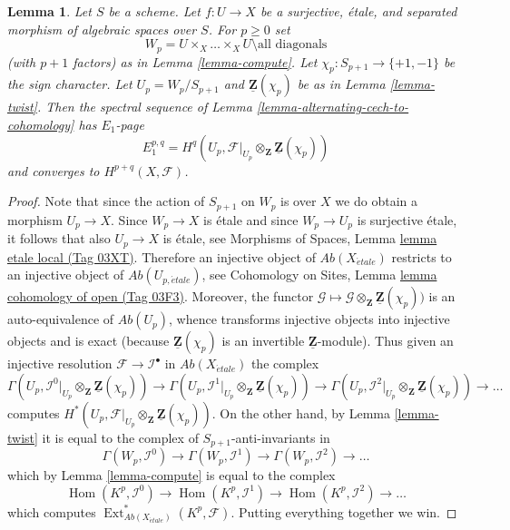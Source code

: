 \documentclass{amsart}
\theoremstyle{plain}
\newtheorem{lemma}[subsection]{Lemma}
\theoremstyle{definition}
\theoremstyle{remark}
\numberwithin{equation}{subsection}
\def\Hom{\mathop{\mathrm{Hom}}\nolimits}
\def\Ext{\mathop{\mathrm{Ext}}\nolimits}
\def\etale{{\acute{e}tale}}
\begin{document}
\begin{lemma}
\label{lemma-alternating-spectral-sequence}
Let $S$ be a scheme. Let $f : U \to X$ be a surjective, \'etale, and
separated morphism of algebraic spaces over $S$. For $p \geq 0$ set
$$
W_p = U \times_X \ldots \times_X U \setminus \text{all diagonals}
$$
(with $p + 1$ factors) as in Lemma \ref{lemma-compute}.
Let $\chi_p : S_{p + 1} \to \{+1, -1\}$ be the sign character.
Let $U_p = W_p/S_{p + 1}$ and $\underline{\mathbf{Z}}(\chi_p)$ be as in
Lemma \ref{lemma-twist}.
Then the spectral sequence of
Lemma \ref{lemma-alternating-cech-to-cohomology}
has $E_1$-page
$$
E_1^{p, q} =
H^q(U_p, \mathcal{F}|_{U_p} \otimes_\mathbf{Z} \underline{\mathbf{Z}}(\chi_p))
$$
and converges to $H^{p + q}(X, \mathcal{F})$.
\end{lemma}

\begin{proof}
Note that since the action of $S_{p + 1}$ on $W_p$ is over $X$ we do
obtain a morphism $U_p \to X$. Since $W_p \to X$ is \'etale and since
$W_p \to U_p$ is surjective \'etale, it follows
that also $U_p \to X$ is \'etale, see
Morphisms of Spaces, Lemma \href{https://stacks.math.columbia.edu/tag/03XT}{lemma etale local (Tag 03XT)}.
Therefore an injective object of
$\textit{Ab}(X_\etale)$ restricts to an injective object of
$\textit{Ab}(U_{p, \etale})$, see
Cohomology on Sites, Lemma \href{https://stacks.math.columbia.edu/tag/03F3}{lemma cohomology of open (Tag 03F3)}.
Moreover, the functor
$\mathcal{G} \mapsto
\mathcal{G} \otimes_\mathbf{Z} \underline{\mathbf{Z}}(\chi_p))$
is an auto-equivalence of $\textit{Ab}(U_p)$, whence transforms injective
objects into injective objects and is exact (because
$\underline{\mathbf{Z}}(\chi_p)$ is an invertible
$\underline{\mathbf{Z}}$-module). Thus given an injective resolution
$\mathcal{F} \to \mathcal{I}^\bullet$ in $\textit{Ab}(X_\etale)$
the complex
$$
\Gamma(U_p,
\mathcal{I}^0|_{U_p} \otimes_\mathbf{Z} \underline{\mathbf{Z}}(\chi_p))
\to
\Gamma(U_p,
\mathcal{I}^1|_{U_p} \otimes_\mathbf{Z} \underline{\mathbf{Z}}(\chi_p))
\to
\Gamma(U_p,
\mathcal{I}^2|_{U_p} \otimes_\mathbf{Z} \underline{\mathbf{Z}}(\chi_p))
\to \ldots
$$
computes
$H^*(U_p,
\mathcal{F}|_{U_p} \otimes_\mathbf{Z} \underline{\mathbf{Z}}(\chi_p))$.
On the other hand, by
Lemma \ref{lemma-twist}
it is equal to the complex of $S_{p + 1}$-anti-invariants in
$$
\Gamma(W_p, \mathcal{I}^0) \to
\Gamma(W_p, \mathcal{I}^1) \to
\Gamma(W_p, \mathcal{I}^2) \to \ldots
$$
which by
Lemma \ref{lemma-compute}
is equal to the complex
$$
\Hom(K^p, \mathcal{I}^0) \to
\Hom(K^p, \mathcal{I}^1) \to
\Hom(K^p, \mathcal{I}^2) \to \ldots
$$
which computes
$\Ext^*_{\textit{Ab}(X_\etale)}(K^p, \mathcal{F})$.
Putting everything together we win.
\end{proof}
\end{document}

